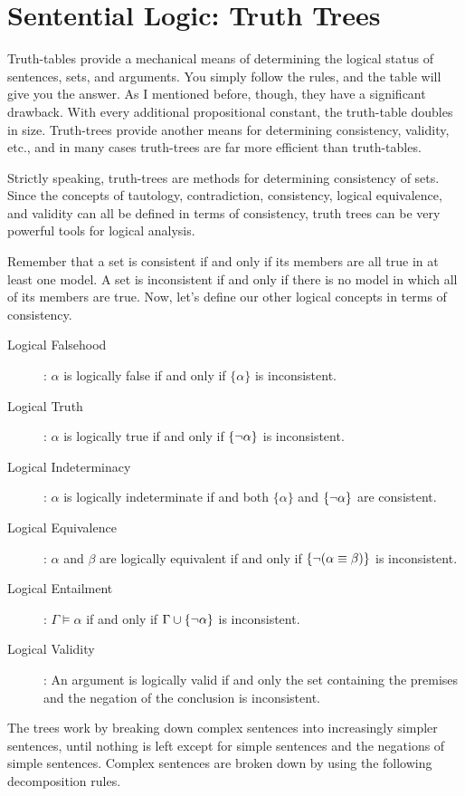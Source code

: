 \documentclass[../logic-text.tex]{subfiles}
\begin{document}
\chapter{Sentential Logic: Truth Trees}
\label{cha:sl-trees}


Truth-tables provide a mechanical means of determining the logical status of sentences, sets, and arguments. You simply follow the rules, and the table will give you the answer. As I mentioned before, though, they have a significant drawback. With every additional propositional constant, the truth-table doubles in size. Truth-trees provide another means for determining consistency, validity, etc., and in many cases truth-trees are far more efficient than truth-tables. 

Strictly speaking, truth-trees are methods for determining consistency of sets. Since the concepts of tautology, contradiction, consistency, logical equivalence, and validity can all be defined in terms of consistency, truth trees can be very powerful tools for logical analysis.

Remember that a set is consistent if and only if its members are all true in at least one model. A set is inconsistent if and only if there is no model in which all of its members are true. Now, let's define our other logical concepts in terms of consistency.


\begin{description}
  \item[Logical Falsehood]: \(\alpha\) is logically false if and only if \(\{\alpha\}\) is inconsistent.
  \item[Logical Truth]: \(\alpha\) is logically true if and only if \(\{\neg \alpha\}\) is inconsistent.
  \item[Logical Indeterminacy]: \(\alpha\) is logically indeterminate if and both \(\{\alpha\}\) and \(\{\neg \alpha\}\) are consistent.
  \item[Logical Equivalence]: \(\alpha\) and \(\beta\) are logically equivalent if and only if \(\{ \neg (\alpha \equiv \beta)\}\) is inconsistent.
  \item[Logical Entailment]: \(\Gamma \vDash \alpha\) if and only if \(\Gamma \cup \{\neg \alpha\}\) is inconsistent.
  \item[Logical Validity]: An argument is logically valid if and only the set containing the premises and the negation of the conclusion is inconsistent. 
\end{description}

The trees work by breaking down complex sentences into increasingly simpler sentences, until nothing is left except for simple sentences and the negations of simple sentences. Complex sentences are broken down by using the following decomposition rules.  
\end{document}

